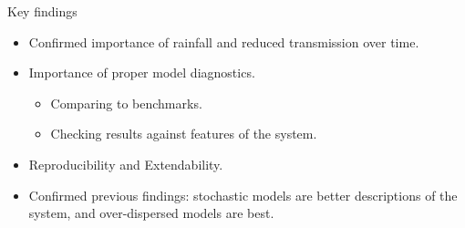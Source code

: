\documentclass[aspectratio=169]{beamer}\usepackage[]{graphicx}\usepackage[]{xcolor}
\begin{document}
\begin{frame}{Key findings}

\begin{itemize}
  \item Confirmed importance of rainfall and reduced transmission over time.
  \item Importance of proper model diagnostics.
  \begin{itemize}
    \item Comparing to benchmarks.
    \item Checking results against features of the system. 
  \end{itemize}
  \item Reproducibility and Extendability. 
  \item Confirmed previous findings: stochastic models are better descriptions of the system, and over-dispersed models are best.
\end{itemize}

\end{frame}
\end{document}
